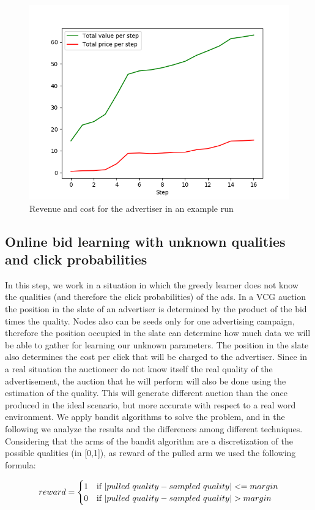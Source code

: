 \documentclass{article}
\begin{document}
\begin{figure}[H]
    \centering
    \includegraphics[width=0.66\linewidth]{images/step3-3.png}
    \caption{Revenue and cost for the advertiser in an example run}
    \label{fig:step3-3}
\end{figure}


\subsection{Online bid learning with unknown qualities and click probabilities}
In this step, we work in a situation in which the greedy learner does not know the qualities (and therefore the click probabilities) of the ads. 
In a VCG auction the position in the slate of an advertiser is determined by the product of the bid times the quality. Nodes also can be seeds only for one advertising campaign, therefore the position occupied in the slate can determine how much data we will be able to gather for learning our unknown parameters. The position in the slate also determines the cost per click that will be charged to the advertiser.
Since in a real situation the auctioneer do not know itself the real quality of the advertisement, the auction that he will perform will also be done using the estimation of the quality. This will generate different auction than the once produced in the ideal scenario, but more accurate with respect to a real word environment.
\newline
We apply bandit algorithms to solve the problem, and in the following we analyze the results and the differences among different techniques.
Considering that the arms of the bandit algorithm are a discretization of the possible qualities (in [0,1]), as reward of the pulled arm we used the following formula: 

\[ reward = \begin{cases} 
      1 & $if $ \vert pulled$ $quality - sampled$ $quality \vert  <= margin \\
      0 & $if $ \vert pulled$ $quality - sampled$ $quality \vert  > margin
\end{cases} \]
\end{document}
